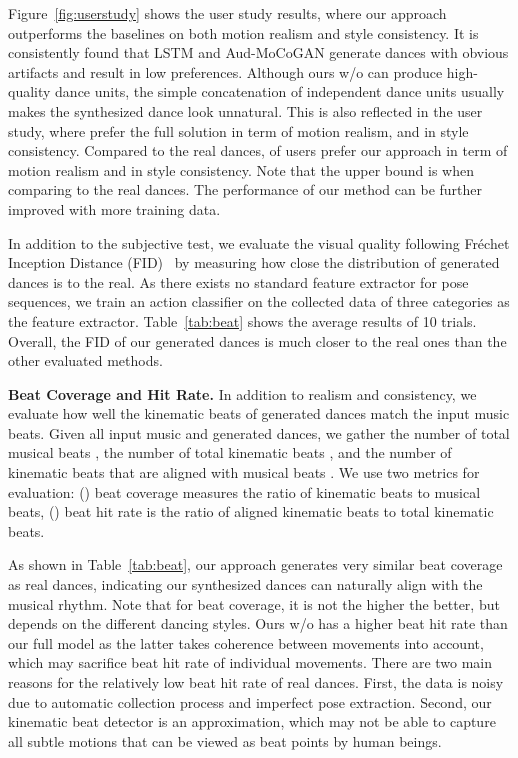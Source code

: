 \documentclass{article}
\newcommand{\figref}[1]{Figure~\ref{fig:#1}}
\newcommand{\tabref}[1]{Table~\ref{tab:#1}}
\begin{document}
\figref{userstudy} shows the user study results, where our approach outperforms the baselines on both motion realism and style consistency.
It is consistently found that LSTM and Aud-MoCoGAN generate dances with obvious artifacts and result in low preferences.
Although ours w/o  can produce high-quality dance units, the simple concatenation of independent dance units usually makes the synthesized dance look unnatural.
This is also reflected in the user study, where  prefer the full solution in term of motion realism, and  in style consistency. 
Compared to the real dances,  of users prefer our approach in term of motion realism and  in style consistency. Note that the upper bound is  when comparing to the real dances. 
The performance of our method can be further improved with more training data.

In addition to the subjective test, we evaluate the visual quality following Fr\'echet Inception Distance (FID)~\cite{fid} by measuring how close the distribution of generated dances is to the real.
As there exists no standard feature extractor for pose sequences, 
we train an action classifier on the collected data of three categories as the feature extractor.
\tabref{beat} shows the average results of 10 trials. 
Overall, the FID of our generated dances is much closer to the real ones than the other evaluated methods.   


\textbf{Beat Coverage and Hit Rate.}
In addition to realism and consistency, we evaluate how well the kinematic beats of generated dances match the input music beats.
Given all input music and generated dances, we gather the number of total musical beats , the number of total kinematic beats , and the number of kinematic beats that are aligned with musical beats .
We use two metrics for evaluation:
() beat coverage  measures the ratio of kinematic beats to musical beats,
() beat hit rate  is the ratio of aligned kinematic beats to total kinematic beats. 

As shown in \tabref{beat}, our approach generates very similar beat coverage as real dances, indicating our synthesized dances can naturally align with the musical rhythm. 
Note that for beat coverage, it is not the higher the better, but depends on the different dancing styles. 
Ours w/o  has a higher beat hit rate than our full model as the latter takes coherence between movements into account, which may sacrifice beat hit rate of individual movements. There are two main reasons for the relatively low beat hit rate of real dances. First, the data is noisy due to automatic collection process and imperfect pose extraction. Second, our kinematic beat detector is an approximation, which may not be able to capture all subtle motions that can be viewed as beat points by human beings.      
\end{document}
